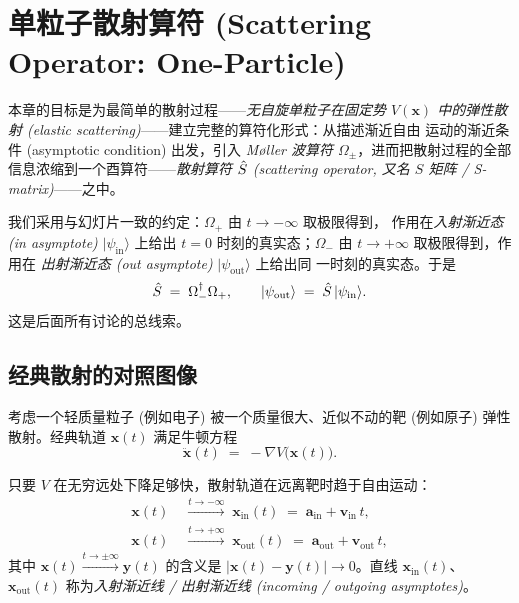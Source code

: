 \chapter{单粒子散射算符 (Scattering Operator: One-Particle)}\label{ch:Smat1P}

本章的目标是为最简单的散射过程——\emph{无自旋单粒子在固定势 $V(\mathbf{x})$
中的弹性散射 (elastic scattering)}——建立完整的算符化形式：从描述渐近自由
运动的渐近条件 (asymptotic condition) 出发，引入 \emph{Møller 波算符
$\Omega_\pm$}，进而把散射过程的全部信息浓缩到一个酉算符——\emph{散射算符
$\hat{S}$ (scattering operator, 又名 $S$ 矩阵 / S-matrix)}——之中。

我们采用与幻灯片一致的约定：$\Omega_+$ 由 $t\to-\infty$ 取极限得到，
作用在\emph{入射渐近态 (in asymptote)} $|\psi_{\text{in}}\rangle$ 上给出
$t=0$ 时刻的真实态；$\Omega_-$ 由 $t\to+\infty$ 取极限得到，作用在
\emph{出射渐近态 (out asymptote)} $|\psi_{\text{out}}\rangle$ 上给出同
一时刻的真实态。于是
\[
  \hat{S} \;=\; \Omega_-^{\dagger}\Omega_+ ,\qquad
  |\psi_{\text{out}}\rangle \;=\; \hat{S}\,|\psi_{\text{in}}\rangle .
\]
这是后面所有讨论的总线索。

\section{经典散射的对照图像}
\label{sec:1P-classical}

考虑一个轻质量粒子 (例如电子) 被一个质量很大、近似不动的靶 (例如原子)
弹性散射。经典轨道 $\mathbf{x}(t)$ 满足牛顿方程
\begin{equation}
  \ddot{\mathbf{x}}(t) \;=\; -\nabla V\bigl(\mathbf{x}(t)\bigr).
  \label{eq:1P-newton}
\end{equation}

只要 $V$ 在无穷远处下降足够快，散射轨道在远离靶时趋于自由运动：
\begin{align}
  \mathbf{x}(t) \;&\xrightarrow{t\to-\infty}\;
    \mathbf{x}_{\text{in}}(t) \;=\; \mathbf{a}_{\text{in}} + \mathbf{v}_{\text{in}}\,t ,
  \label{eq:1P-xin}\\
  \mathbf{x}(t) \;&\xrightarrow{t\to+\infty}\;
    \mathbf{x}_{\text{out}}(t) \;=\; \mathbf{a}_{\text{out}} + \mathbf{v}_{\text{out}}\,t ,
  \label{eq:1P-xout}
\end{align}
其中 $\mathbf{x}(t)\xrightarrow{t\to\pm\infty}\mathbf{y}(t)$ 的含义是
$|\mathbf{x}(t)-\mathbf{y}(t)|\to 0$。直线 $\mathbf{x}_{\text{in}}(t)$、
$\mathbf{x}_{\text{out}}(t)$ 称为\emph{入射渐近线 / 出射渐近线
(incoming / outgoing asymptotes)}。

